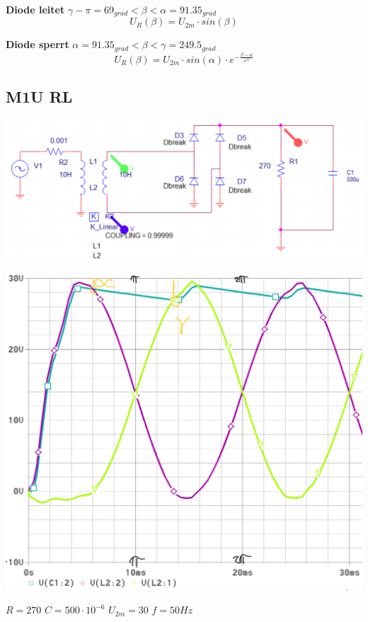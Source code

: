 \textbf{Diode leitet} $ \gamma - \pi = 69_{grad} < \beta < \alpha = 91.35_{grad} $\newline
\[  U_R(\beta) = U_{2m} \cdot sin(\beta)\]

\textbf{Diode sperrt} $ \alpha = 91.35_{grad}< \beta < \gamma = 249.5_{grad}  $\newline
\[  U_R(\beta)  =  U_{2m} \cdot sin(\alpha) \cdot e^{-\frac{\beta - \alpha}{\omega \tau}}\]

\clearpage
\subsection{M1U RL}
\begin{minipage}{0.4\linewidth}
    \includegraphics[width=\linewidth]{images/Rechnungsbsp/B2URC}
\end{minipage}
\begin{minipage}{0.2\linewidth}
    \includegraphics[width=\linewidth]{images/Rechnungsbsp/B2URCKl}
\end{minipage}
\begin{minipage}{5cm}
    $ R = 270 $ \newline
    $ C = 500 \cdot 10^{-6} $\newline
    $ U_{2m} = 30 $ \newline
    $ f = 50 Hz $   
\end{minipage}

